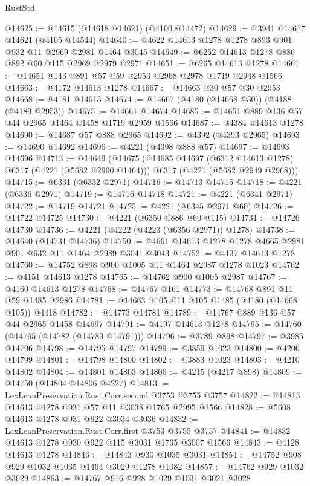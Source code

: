 \begin{lexlean}{RustStd}
\begin{coremodule}
@14625 := @14615 (@14618 @14621) (@4100 @14472)
@14629 := @3941 @14617 @14621 (@4105 @14544)
@14640 := @4622 @14613 @1278 @1278 @893 @901 @932 @11 @2969 @2981 @1464 @3045
@14649 := @6252 @14613 @1278 @886 @892 @60 @115 @2969 @2979 @2971
@14651 := @6265 @14613 @1278
@14661 := @14651 @143 @891 @57 @59 @2953 @2968 @2978 @1719 @2948 @1566
@14663 := @4172 @14613 @1278
@14667 := @14663 @30 @57 @30 @2953
@14668 := @4181 @14613
@14674 := @14667 (@4180 (@14668 @30)) (@4188 (@4189 @2953))
@14675 := @14661 @14674
@14685 := @14651 @889 @136 @57 @44 @2965 @1464 @1458 @1719 @2959 @1566
@14687 := @4384 @14613 @1278
@14690 := @14687 @57 @888 @2965
@14692 := @4392 (@4393 @2965)
@14693 := @14690 @14692
@14696 := @4221 (@4398 @888 @57)
@14697 := @14693 @14696
@14713 := @14649
    (@14675
      (@14685 @14697 (@6312 @14613 @1278) @6317 (@4221 (@5682 @2960 @1464)))
      @6317
      (@4221 (@5682 @2949 @2968)))
@14715 := @6331 (@6332 @2971)
@14716 := @14713 @14715
@14718 := @4221 (@6336 @2971)
@14719 := @14716 @14718
@14721 := @4221 (@6341 @2971)
@14722 := @14719 @14721
@14725 := @4221 (@6345 @2971 @60)
@14726 := @14722 @14725
@14730 := @4221 (@6350 @886 @60 @115)
@14731 := @14726 @14730
@14736 := @4221 (@4222 (@4223 (@6356 @2971)) @1278)
@14738 := @14640 (@14731 @14736)
@14750 := @4661 @14613 @1278 @1278 @4665 @2981 @901 @932 @11 @1464 @2989 @3041 @3043
@14752 := @4137 @14613 @1278
@14760 := @14752 @898 @900 @1005 @11 @1464 @2987 @1278 @1023
@14762 := @4151 @14613 @1278
@14765 := @14762 @900 @1005 @2987
@14767 := @4160 @14613 @1278
@14768 := @14767 @161
@14773 := @14768 @891 @11 @59 @1485 @2986
@14781 := @14663 @105 @11 @105 @1485 (@4180 (@14668 @105)) @4418
@14782 := @14773 @14781
@14789 := @14767 @889 @136 @57 @44 @2965 @1458 @14697
@14791 := @4197 @14613 @1278
@14795 := @14760 (@14765 (@14782 (@14789 @14791)))
@14796 := @3789 @898
@14797 := @3985 @14796
@14798 := @14795 @14797
@14799 := @3859 @1023
@14800 := @4206 @14799
@14801 := @14798 @14800
@14802 := @3883 @1023
@14803 := @4210 @14802
@14804 := @14801 @14803
@14806 := @4215 (@4217 @898)
@14809 := @14750 (@14804 @14806 @4227)
@14813 := LexLeanPreservation.Rust.Corr.second @3753 @3755 @3757
@14822 := @14813 @14613 @1278 @931 @57 @11 @3038 @1765 @2995 @1566
@14828 := @5608 @14613 @1278 @931 @922 @3034 @3036
@14832 := LexLeanPreservation.Rust.Corr.first @3753 @3755 @3757
@14841 := @14832 @14613 @1278 @930 @922 @115 @3031 @1765 @3007 @1566
@14843 := @4128 @14613 @1278
@14846 := @14843 @930 @1035 @3031
@14854 := @14752 @908 @929 @1032 @1035 @1464 @3029 @1278 @1082
@14857 := @14762 @929 @1032 @3029
@14863 := @14767 @916 @928 @1029 @1031 @3021 @3028

\end{coremodule}
\end{lexlean}
